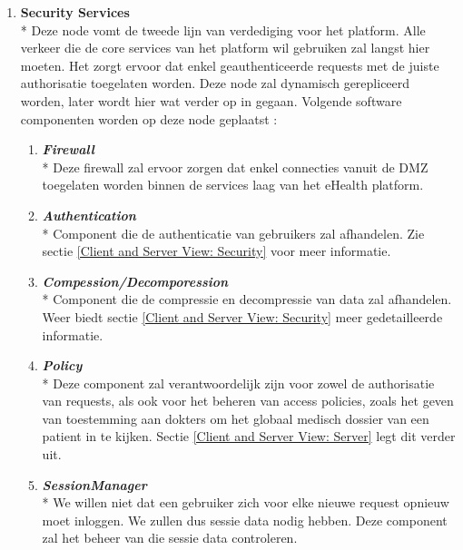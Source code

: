\documentclass[a4paper,10pt]{article}
\begin{document}
\begin{enumerate}
\item \textbf{Security Services}\\*
Deze node vomt de tweede lijn van verdediging voor het platform. Alle verkeer die de core services van het platform wil gebruiken zal langst hier moeten. Het zorgt ervoor dat enkel geauthenticeerde requests met de juiste authorisatie toegelaten worden. Deze node zal dynamisch gerepliceerd worden, later wordt hier wat verder op in gegaan. Volgende software componenten worden op deze node geplaatst : 
\begin{enumerate}
 \item \textit{\textbf{Firewall}}\\*
Deze firewall zal ervoor zorgen dat enkel connecties vanuit de DMZ toegelaten worden binnen de services laag van het eHealth platform.
\item \textit{\textbf{Authentication}}\\*
Component die de authenticatie van gebruikers zal afhandelen. Zie sectie \ref{Client and Server View: Security} voor meer informatie.
\item \textit{\textbf{Compession/Decomporession}}\\*
Component die de compressie en decompressie van data zal afhandelen. Weer biedt sectie \ref{Client and Server View: Security} meer gedetailleerde informatie.
\item \textit{\textbf{Policy}}\\*
Deze component zal verantwoordelijk zijn voor zowel de authorisatie van requests, als ook voor het beheren van access policies, zoals het geven van toestemming aan dokters om het globaal medisch dossier van een patient in te kijken. Sectie \ref{Client and Server View: Server} legt dit verder uit.
\item \textit{\textbf{SessionManager}}\\*
We willen niet dat een gebruiker zich voor elke nieuwe request opnieuw moet inloggen. We zullen dus sessie data nodig hebben. Deze component zal het beheer van die sessie data controleren.
\end{enumerate}


\end{enumerate}
\end{document}
